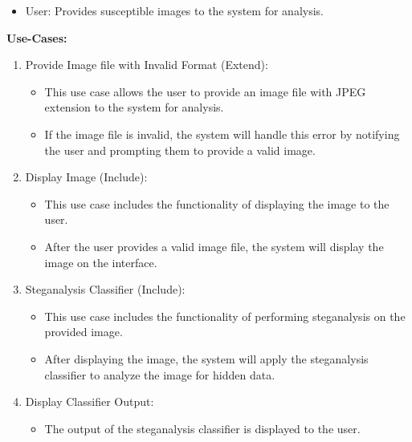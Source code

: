\begin{itemize}[noitemsep]
    \item User: Provides susceptible images to the system for analysis.
\end{itemize}
\begin{flushleft}
    \large{\textbf{Use-Cases:}}
\end{flushleft}
\begin{enumerate}[noitemsep]
    \item Provide Image file with Invalid Format (Extend):
          \begin{itemize}
              \item This use case allows the user to provide an image file with JPEG extension to the system for analysis.
              \item If the image file is invalid, the system will handle this error by notifying the user and prompting them to provide a valid image.
          \end{itemize}
    \item Display Image (Include):
          \begin{itemize}
              \item This use case includes the functionality of displaying the image to the user.
              \item After the user provides a valid image file, the system will display the image on the interface.
          \end{itemize}

    \item Steganalysis Classifier (Include):
          \begin{itemize}
              \item This use case includes the functionality of performing steganalysis on the provided image.
              \item After displaying the image, the system will apply the steganalysis classifier to analyze the image for hidden data.
          \end{itemize}

    \item Display Classifier Output:
          \begin{itemize}
              \item The output of the steganalysis classifier is displayed to the user.
          \end{itemize}
\end{enumerate}
\clearpage
